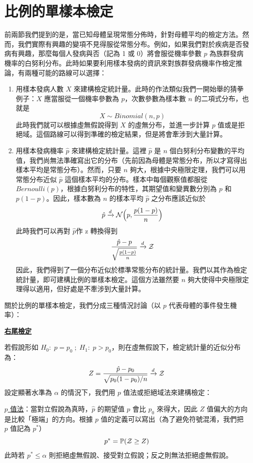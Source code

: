 \section{比例的單樣本檢定}
    前兩節我們提到的是，當已知母體呈現常態分佈時，針對母體平均的檢定方法。然而，我們實際有興趣的變項不見得服從常態分布。例如，如果我們對於疾病是否發病有興趣，那麼每個人發病與否（記為 1 或 0）將會服從機率參數 $p$ 為族群發病機率的白努利分布。此時如果要利用樣本發病的資訊來對族群發病機率作檢定推論，有兩種可能的路線可以選擇：
    \begin{enumerate}
        \item 用樣本發病人數 $X$ 來建構檢定統計量。此時的作法類似我們一開始舉的猜拳例子：$X$ 應當服從一個機率參數為 $p$，次數參數為樣本數 $n$ 的二項式分布，也就是
        \[X \sim Binomial(n,p)\]
        此時我們就可以根據虛無假說得到 $X$ 的虛無分布，並進一步計算 $p$ 值或是拒絕域。這個路線可以得到準確的檢定結果，但是將會牽涉到大量計算。
        \item 用樣本發病機率 $\hat{p}$ 來建構檢定統計量。這裡 $\hat{p}$ 是 $n$ 個白努利分布變數的平均值，我們尚無法準確寫出它的分布（先前因為母體是常態分布，所以才寫得出樣本平均是常態分布）。然而，只要 $n$ 夠大，根據中央極限定理，我們可以用常態分布近似 $\hat{p}$ 這個樣本平均的分布。樣本中每個觀察值都服從 $Bernoulli(p)$，根據白努利分布的特性，其期望值和變異數分別為 $p$ 和 $p(1-p)$。因此，樣本數為 $n$ 的樣本平均 $\hat{p}$ 之分布應該近似於
        \[\hat{p} \xrightarrow[]{d} \mathcal{N}\Big(p, \frac{p(1-p)}{n}\Big)\]
        此時我們可以再對 $\hat{p}$作 z 轉換得到
        \[\frac{\hat{p}-p}{\sqrt{\frac{p(1-p)}{n}}} \xrightarrow[]{d} \mathcal{Z}\]
        因此，我們得到了一個分布近似於標準常態分布的統計量。我們以其作為檢定統計量，即可建構比例的單樣本檢定。這個方法雖然要 $n$ 夠大使得中央極限定理得以適用，但好處是不牽涉到大量計算。
    \end{enumerate}

    關於比例的單樣本檢定，我們分成三種情況討論（以 $p$ 代表母體的事件發生機率）：

    \noindent\underline{\textbf{右尾檢定}}

    若假說形如 $H_0: \; p = p_0 \; ; \; H_1: \; p > p_0$，則在虛無假說下，檢定統計量的近似分布為：
    \[Z = \frac{\hat{p}-p_0}{\sqrt{p_0(1-p_0)/n}} \xrightarrow[]{d} \mathcal{Z}\]
    設定顯著水準為 $\alpha$ 的情況下，我們用 $p$ 值法或拒絕域法來建構檢定：

    \noindent \underline{$p$ 值法}：當對立假說為真時，$\hat{p}$ 的期望值 $p$ 會比 $p_0$ 來得大，因此 $Z$ 值偏大的方向是比較「極端」的方向。根據 $p$ 值的定義可以寫出（為了避免符號混淆，我們把 $p$ 值記為 $p^*$）
    \[p^* = \mathbb{P}(\mathcal{Z} \ge Z)\]
    此時若 $p^* \le \alpha$ 則拒絕虛無假說、接受對立假說；反之則無法拒絕虛無假說。
    
